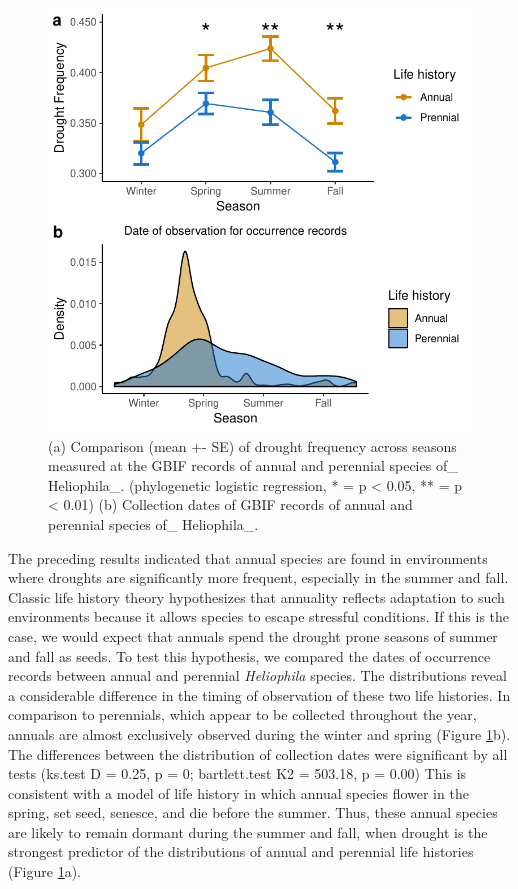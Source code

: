 \documentclass[man,floatsintext]{apa6}
\theoremstyle{definition}
\theoremstyle{definition}
\theoremstyle{definition}
\theoremstyle{remark}
\begin{document}
\begin{figure}[!h]
\includegraphics[width=\textwidth]{../figures/line_and_dates} \caption{(a) Comparison (mean +- SE) of drought frequency across
seasons measured at the GBIF records of annual and perennial species
of\_ Heliophila\_. (phylogenetic logistic regression, * = p \textless{}
0.05, ** = p \textless{} 0.01) (b) Collection dates of GBIF records of
annual and perennial species of\_ Heliophila\_.}\label{fig:lineplots}
\end{figure}

The preceding results indicated that annual species are found in
environments where droughts are significantly more frequent, especially
in the summer and fall. Classic life history theory hypothesizes that
annuality reflects adaptation to such environments because it allows
species to escape stressful conditions. If this is the case, we would
expect that annuals spend the drought prone seasons of summer and fall
as seeds. To test this hypothesis, we compared the dates of occurrence
records between annual and perennial \emph{Heliophila} species. The
distributions reveal a considerable difference in the timing of
observation of these two life histories. In comparison to perennials,
which appear to be collected throughout the year, annuals are almost
exclusively observed during the winter and spring (Figure
\ref{fig:lineplots}b). The differences between the distribution of
collection dates were significant by all tests (ks.test D = 0.25, p = 0;
bartlett.test K2 = 503.18, p = 0.00) This is consistent with a model of
life history in which annual species flower in the spring, set seed,
senesce, and die before the summer. Thus, these annual species are
likely to remain dormant during the summer and fall, when drought is the
strongest predictor of the distributions of annual and perennial life
histories (Figure \ref{fig:lineplots}a).
\end{document}
